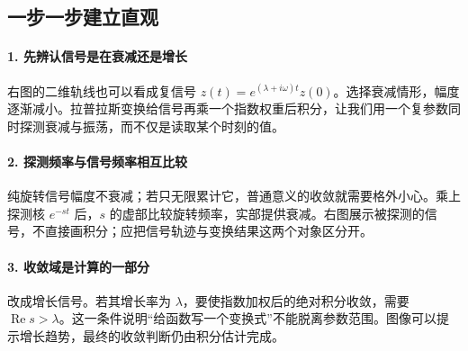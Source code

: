 \subsection*{一步一步建立直观}

\paragraph{1. 先辨认信号是在衰减还是增长}

右图的二维轨线也可以看成复信号 $z(t)=e^{(\lambda+i\omega)t}z(0)$。选择衰减情形，幅度逐渐减小。拉普拉斯变换给信号再乘一个指数权重后积分，让我们用一个复参数同时探测衰减与振荡，而不仅是读取某个时刻的值。



\paragraph{2. 探测频率与信号频率相互比较}

纯旋转信号幅度不衰减；若只无限累计它，普通意义的收敛就需要格外小心。乘上探测核 $e^{-st}$ 后，$s$ 的虚部比较旋转频率，实部提供衰减。右图展示被探测的信号，不直接画积分；应把信号轨迹与变换结果这两个对象区分开。



\paragraph{3. 收敛域是计算的一部分}

改成增长信号。若其增长率为 $\lambda$，要使指数加权后的绝对积分收敛，需要 $\operatorname{Re}s>\lambda$。这一条件说明“给函数写一个变换式”不能脱离参数范围。图像可以提示增长趋势，最终的收敛判断仍由积分估计完成。
